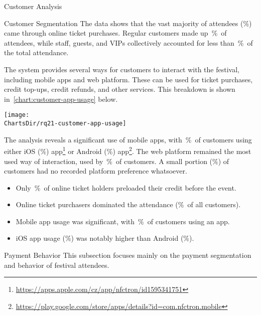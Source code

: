 \begin{section}{Customer Analysis}
\begin{subsection}{Customer Segmentation}
		The data shows that the vast majority of attendees (\%) came through online ticket purchases.
		Regular customers made up~\%~of attendees, while staff, guests, and VIPs collectively accounted for less than~\%~of the total attendance.


		The system provides several ways for customers to interact with the festival, including mobile apps and web platform.
		These can be used for ticket purchases, credit top-ups, credit refunds, and other services.
		This breakdown is shown in~\autoref{chart:customer-app-usage} below.

		\begin{chart}[h]
			\centering
			\texttt{[image: \\ChartsDir/rq21-customer-app-usage]}
			\caption{ Customer App Usage}
			\label{chart:customer-app-usage}
			\source
		\end{chart}

		The analysis reveals a significant use of mobile apps, with~\%~of customers using either iOS (\%) app\footnote{\url{https://apps.apple.com/cz/app/nfctron/id1595341751}}
		or Android (\%) app\footnote{\url{https://play.google.com/store/apps/details?id=com.nfctron.mobile}}.
		The web platform remained the most used way of interaction, used by~\%~of customers.
		A small portion (\%) of customers had no recorded platform preference whatsoever.

		\begin{keytakeaways}
			\begin{itemize}
				\item Only~\%~of online ticket holders preloaded their credit before the event.
				\item Online ticket purchasers dominated the attendance (\%~of all customers).
				\item Mobile app usage was significant, with~\%~of customers using an app.
				\item iOS app usage (\%) was notably higher than Android (\%).
			\end{itemize}
		\end{keytakeaways}
	\end{subsection}


	\begin{subsection}{Payment Behavior}
		\label{subsec:analysis-customer-payment-behavior}
		This subsection focuses mainly on the payment segmentation and behavior of festival attendees.


\end{subsection}
\end{section}
